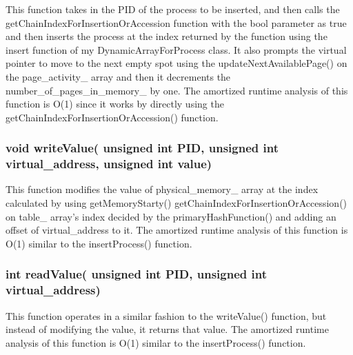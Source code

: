         This function takes in the {\color{draculapurple}PID} of the process to be inserted, and then calls the {\color{draculapurple}getChainIndexForInsertionOrAccession} function with the 
        {\color{orange}bool} parameter as {\color{LightPink}true} and then inserts the process at the index returned by the function using the {\color{draculapurple}insert} function of my {\color{draculapurple}DynamicArrayForProcess} class.
        It also prompts the virtual pointer to move to the next empty spot using the {\color{draculapurple}updateNextAvailablePage()} 
        on the {\color{Turquoise}page\_activity\_} array and then it decrements the {\color{Turquoise}number\_of\_pages\_in\_memory\_} by one.
        The amortized runtime analysis of this function is {\color{lightblue}O(1)} since it works by directly using the {\color{draculapurple}getChainIndexForInsertionOrAccession()} function.

    \subsubsection{{\color{orange}void} {\color{draculapurple}writeValue}({\color{orange} unsigned int} PID, {\color{orange}unsigned int} virtual\_address, {\color{orange}unsigned int} value)}
        This function modifies the value of {\color{Turquoise}physical\_memory\_} array at the index calculated by using 
        {\color{draculapurple}getMemoryStarty()} {\color{draculapurple}getChainIndexForInsertionOrAccession()} on 
        {\color{Turquoise}table\_} array's index decided by the {\color{draculapurple}primaryHashFunction()} and adding an 
        offset of {\color{Turquoise}virtual\_address} to it. The amortized runtime analysis of this function is {\color{lightblue}O(1)} similar to the {\color{draculapurple}insertProcess()} function.

    \subsubsection{{\color{orange}int} {\color{draculapurple}readValue}({\color{orange} unsigned int} PID, {\color{orange}unsigned int} virtual\_address)}
        This function operates in a similar fashion to the {\color{draculapurple}writeValue()} function, but instead of 
        modifying the value, it returns that value. The amortized runtime analysis of this function is 
        {\color{lightblue}O(1)} similar to the {\color{draculapurple}insertProcess()} function.

